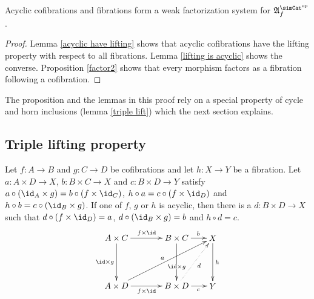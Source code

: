 \documentclass{tac}
\newcommand\dual{^{\mathrm{op}}}
\newcommand\s{^{\simCat\dual}}
\newcommand\of{:}
\newcommand\f{_f}
\newcommand\ambient{\mathfrak A}
\begin{document}
\begin{theorem} Acyclic cofibrations and fibrations form a weak factorization system for $\ambient\s\f$. \end{theorem}

\begin{proof} Lemma \ref{acyclic have lifting} shows that acyclic cofibrations have the lifting property with respect to all fibrations. Lemma \ref{lifting is acyclic} shows the converse. Proposition \ref{factor2} shows that every morphism factors as a fibration following a cofibration. 
\end{proof}

The proposition and the lemmas in this proof rely on a special property of cycle and horn inclusions (lemma \ref{triple lift}) which the next section explains.

\subsection{Triple lifting property}

\begin{lemma} Let $f\of A\to B$ and $g\of C\to D$ be cofibrations and let $h\of X\to Y$ be a fibration. Let $a\of A\times D\to X$, $b\of B\times C\to X$ and $c\of B \times D\to Y$ satisfy $a\circ(\id_A\times g) = b\circ(f\times \id_C)$, $h\circ a=c\circ(f\times \id_D)$ and $h\circ b=c\circ(\id_B\times g)$. If one of $f$, $g$ or $h$ is acyclic, then there is a $d\of B\times D\to X$ such that $d\circ(f\times\id_D)=a$, $d\circ(\id_B\times g)=b$ and $h\circ d = c$.
\[\xy
(0,20)*+{A\times C}="AC",(25,20)*+{B\times C}="BC",(40,20)*+{X}="X",
(0,0)*+{A\times D}="AD",(25,0)*+{B\times D}="BD",(40,0)*+{Y}="Y"
\ar^{f\times\id} "AC";"BC"
\ar_{\id\times g} "AC";"AD"
\ar_{f\times\id} "AD";"BD"
\ar^{a} "AD";"X"
\ar|(.6){\id\times g} "BC";"BD"
\ar^(.6){b} "BC";"X"
\ar@{.>}_{d} "BD";"X"
\ar_(.6){c} "BD";"Y"
\ar^{h} "X";"Y"
\endxy\]
\label{triple lift}
\end{lemma}
\end{document}

